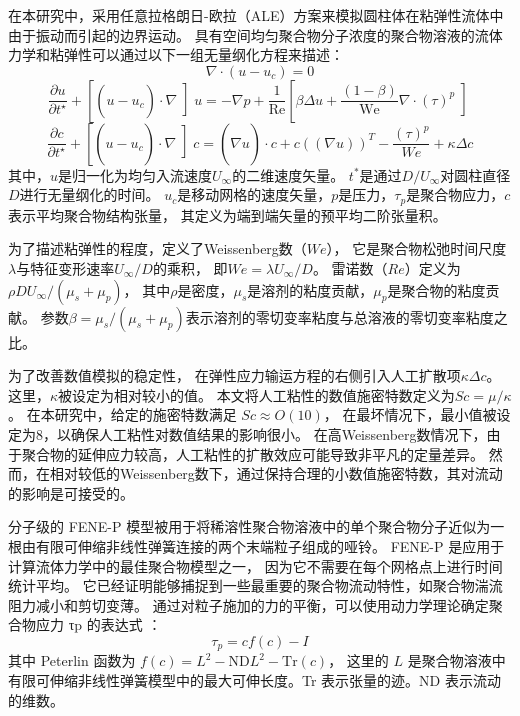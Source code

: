 \documentclass[UTF8,zihao=5]{ctexart} %
\begin{document}
在本研究中，采用任意拉格朗日-欧拉（ALE）方案来模拟圆柱体在粘弹性流体中由于振动而引起的边界运动。
具有空间均匀聚合物分子浓度的聚合物溶液的流体力学和粘弹性可以通过以下一组无量纲化方程来描述：
\newcommand*{\uu}[0]{\mathrm{u}}
\newcommand*{\cc}[0]{\mathrm{c}}
\newcommand*{\ts}[0]{{t^*}}
\begin{equation}
    \nabla \cdot \left(\right. u - u_{c} \left.\right) = 0
\end{equation}
\begin{equation}
    \frac{\partial u}{\partial t^{\star}} + \left[\right. \left(\right. u - u_{c} \left.\right) \cdot \nabla \left]\right. u = - \nabla p + \frac{1}{\text{Re}} \left[\right. \beta \Delta u + \frac{\left(\right. 1 - \beta \left.\right)}{\text{We}} \nabla \cdot \left(\tau\right)^{p} \left]\right.
\end{equation}
\begin{equation}
    \frac{\partial c}{\partial t^{\star}} + \left[\right. \left(\right. u - u_{c} \left.\right) \cdot \nabla \left]\right. c = \left(\right. \nabla u \left.\right) \cdot c + c \left(\left(\right. \nabla u \left.\right)\right)^{T} - \frac{\left(\tau\right)^{p}}{W e} + \kappa \Delta c
\end{equation}
其中，\(u\)是归一化为均匀入流速度\(U_\infty\)的二维速度矢量。
\(t^*\)是通过\(D/U_\infty\)对圆柱直径\(D\)进行无量纲化的时间。
\(u_c\)是移动网格的速度矢量，\(p\)是压力，\(\tau_p\)是聚合物应力，\(c\)表示平均聚合物结构张量，
其定义为端到端矢量的预平均二阶张量积。

为了描述粘弹性的程度，定义了Weissenberg数（\(We\)），
它是聚合物松弛时间尺度\(\lambda\)与特征变形速率\(U_\infty/D\)的乘积，
即\(We = \lambda U_\infty/D\)。
雷诺数（\(Re\)）定义为\(\rho DU_\infty/(\mu_s + \mu_p)\)，
其中\(\rho\)是密度，\(\mu_s\)是溶剂的粘度贡献，\(\mu_p\)是聚合物的粘度贡献。
参数\(\beta = \mu_s/(\mu_s + \mu_p)\)表示溶剂的零切变率粘度与总溶液的零切变率粘度之比。

为了改善数值模拟的稳定性，
在弹性应力输运方程的右侧引入人工扩散项\(\kappa \Delta c\)。
这里，\(\kappa\)被设定为相对较小的值。
本文将人工粘性的数值施密特数定义为\(Sc = \mu/\kappa\)。
在本研究中，给定的施密特数满足
\(Sc \approx O(10)\)，
在最坏情况下，最小值被设定为8，以确保人工粘性对数值结果的影响很小。
在高Weissenberg数情况下，由于聚合物的延伸应力较高，人工粘性的扩散效应可能导致非平凡的定量差异。
然而，在相对较低的Weissenberg数下，通过保持合理的小数值施密特数，其对流动的影响是可接受的。

分子级的 FENE-P 模型被用于将稀溶性聚合物溶液中的单个聚合物分子近似为一根由有限可伸缩非线性弹簧连接的两个末端粒子组成的哑铃。
FENE-P 是应用于计算流体力学中的最佳聚合物模型之一，
因为它不需要在每个网格点上进行时间统计平均。
它已经证明能够捕捉到一些最重要的聚合物流动特性，如聚合物湍流阻力减小和剪切变薄。
通过对粒子施加的力的平衡，可以使用动力学理论确定聚合物应力 τp 的表达式 ：
\begin{equation}
    \tau_p = cf(c) - I
\end{equation}
其中 Peterlin 函数为
\(f(c) = L^2 - \text{ND}L^2 - \text{Tr}(c)\)，
这里的 \(L\) 是聚合物溶液中有限可伸缩非线性弹簧模型中的最大可伸长度。Tr 表示张量的迹。ND 表示流动的维数。
\end{document}
